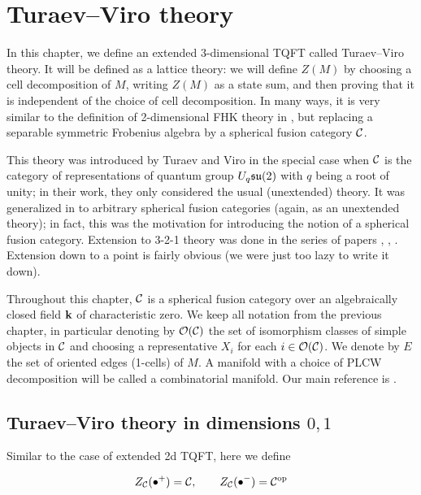 \chapter{Turaev--Viro theory}\label{c:TV}



In this chapter, we define an extended 3-dimensional TQFT called
Turaev--Viro theory. It will be defined as a lattice theory: we will define
$Z(M)$ by choosing a cell decomposition of $M$, writing $Z(M)$ as a state
sum, and then proving that it is independent of the choice of cell
decomposition. In many ways, it is very similar to the definition of
2-dimensional FHK theory in , but replacing a separable
symmetric Frobenius algebra by a spherical fusion category $\mathcal{C}$.

This theory was introduced by Turaev and Viro  in the
special case  when $\mathcal{C}$ is the category of representations of quantum
group $U_q\mathfrak{su}(2)$ with $q$ being a root of unity; in their work, they only
considered the usual (unextended) theory. It was generalized in
 to arbitrary spherical fusion categories (again, as an
unextended theory); in fact, this was the motivation for introducing the
notion of a spherical fusion category. Extension to 3-2-1 theory was done 
in the series of papers , 
, . 
Extension down to a point is fairly obvious (we were just too lazy to write 
it down).

Throughout this chapter, $\mathcal{C}$ is a spherical fusion category over an
algebraically closed field $\mathbf{k}$ of characteristic zero. We keep all
notation from the previous chapter, in particular denoting by $\mathcal{O}(\mathcal{C})$ the set
of isomorphism classes of simple objects in $\mathcal{C}$ and choosing a
representative $X_i$ for each $i\in \mathcal{O}(\mathcal{C})$. We denote by $E$ the set of oriented
 edges (1-cells) of $M$. A manifold with a choice of PLCW decomposition will be 
 called a combinatorial manifold. Our main reference is .



\section{Turaev--Viro theory in dimensions $0,1$}\label{s:tv-dim01}

Similar to the case of extended 2d TQFT, here we define

$$
Z_{\mathcal{C}}(\bullet^+)=\mathcal{C}, \qquad
Z_{\mathcal{C}}(\bullet^-)=\mathcal{C}^{\mathrm{op}}
$$

